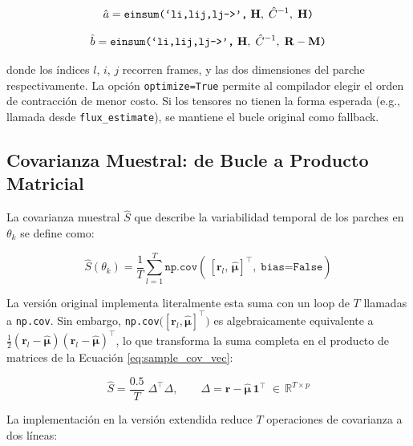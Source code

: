 \begin{equation}\label{eq:einsum_a}
    \hat{a} = \texttt{einsum(`li,lij,lj->',\;}\mathbf{H},\;\hat{C}^{-1},\;\mathbf{H}\texttt{)}
\end{equation}

\begin{equation}\label{eq:einsum_b}
    \hat{b} = \texttt{einsum(`li,lij,lj->',\;}\mathbf{H},\;\hat{C}^{-1},\;\mathbf{R}-\mathbf{M}\texttt{)}
\end{equation}

donde los índices $l$, $i$, $j$ recorren frames, y las dos dimensiones del parche respectivamente. La opción \texttt{optimize=True} permite al compilador elegir el orden de contracción de menor costo. Si los tensores no tienen la forma esperada (e.g., llamada desde \texttt{flux\_estimate}), se mantiene el bucle original como fallback.

\subsection{Covarianza Muestral: de Bucle a Producto Matricial}

La covarianza muestral $\hat{S}$ que describe la variabilidad temporal de los parches en $\theta_k$ se define como:

\begin{equation}\label{eq:sample_cov}
    \hat{S}(\theta_k) = \frac{1}{T} \sum_{l=1}^{T} \texttt{np.cov}\!\left(\,[\mathbf{r}_l,\, \hat{\boldsymbol{\mu}}]^\top,\; \texttt{bias=False}\right)
\end{equation}

La versión original implementa literalmente esta suma con un loop de $T$ llamadas a \texttt{np.cov}. Sin embargo, \texttt{np.cov}$\big([\mathbf{r}_l, \hat{\boldsymbol{\mu}}]^\top\big)$ es algebraicamente equivalente a $\frac{1}{2}(\mathbf{r}_l - \hat{\boldsymbol{\mu}})(\mathbf{r}_l - \hat{\boldsymbol{\mu}})^\top$, lo que transforma la suma completa en el producto de matrices de la Ecuación \ref{eq:sample_cov_vec}:

\begin{equation}\label{eq:sample_cov_vec}
    \hat{S} = \frac{0{.}5}{T}\;\Delta^\top \Delta, \qquad \Delta = \mathbf{r} - \hat{\boldsymbol{\mu}}\,\mathbf{1}^\top \;\in\, \mathbb{R}^{T \times p}
\end{equation}

La implementación en la versión extendida reduce $T$ operaciones de covarianza a dos líneas:

